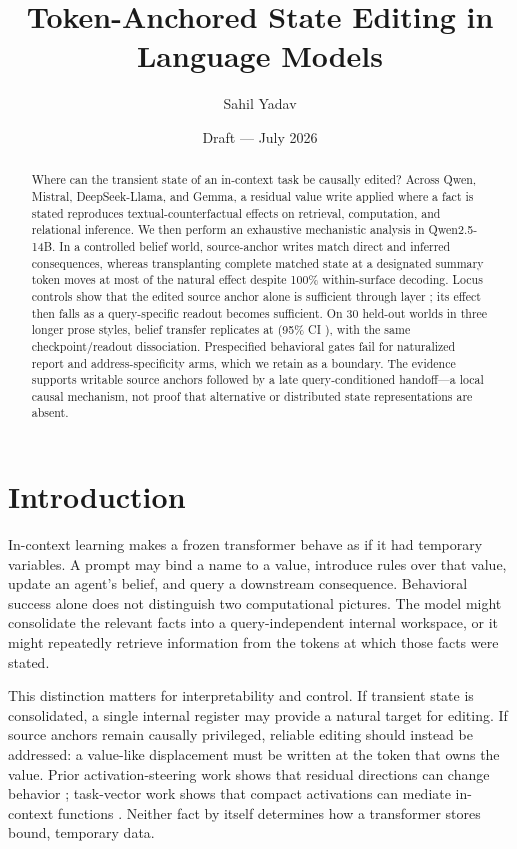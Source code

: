 \documentclass[10pt]{article}
\title{\textbf{Token-Anchored State Editing in Language Models}}
\author{Sahil Yadav}
\date{Draft --- July 2026}
\begin{document}
\maketitle

\begin{abstract}
Where can the transient state of an in-context task be causally edited? Across
Qwen, Mistral, DeepSeek-Llama, and Gemma, a residual value write applied where
a fact is stated reproduces textual-counterfactual effects on retrieval,
computation, and relational inference. We then perform an exhaustive
mechanistic analysis in Qwen2.5-14B. In a controlled belief world, source-anchor
writes match direct and inferred consequences, whereas transplanting complete
matched state at a designated summary token moves at most
\ConfirmQwenFourteenCheckpointMax{} of the natural effect despite 100\%
within-surface decoding. Locus controls show that the edited source anchor
alone is sufficient through layer \ConfirmCloseoutExactLastLayer{}; its effect
then falls as a query-specific readout becomes sufficient. On 30 held-out
worlds in three longer prose styles, belief transfer replicates at
\ConfirmNaturalAnchorBelief{} (95\% CI \ConfirmNaturalAnchorBeliefCI{}), with
the same checkpoint/readout dissociation. Prespecified behavioral gates fail
for naturalized report and address-specificity arms, which we retain as a
boundary. The evidence supports writable source anchors followed by a late
query-conditioned handoff---a local causal mechanism, not proof that
alternative or distributed state representations are absent.
\end{abstract}

\section{Introduction}

In-context learning makes a frozen transformer behave as if it had temporary
variables. A prompt may bind a name to a value, introduce rules over that
value, update an agent's belief, and query a downstream consequence. Behavioral
success alone does not distinguish two computational pictures. The model might
consolidate the relevant facts into a query-independent internal workspace, or
it might repeatedly retrieve information from the tokens at which those facts
were stated.

This distinction matters for interpretability and control. If transient state
is consolidated, a single internal register may provide a natural target for
editing. If source anchors remain causally privileged, reliable editing should
instead be addressed: a value-like displacement must be written at the token
that owns the value. Prior activation-steering work shows that residual
directions can change behavior \citep{turner2023steering,zou2023representation,
rimsky2024steering}; task-vector work shows that compact activations can mediate
in-context functions \citep{hendel2023task,todd2024function}. Neither fact by
itself determines how a transformer stores bound, temporary data.
\end{document}
